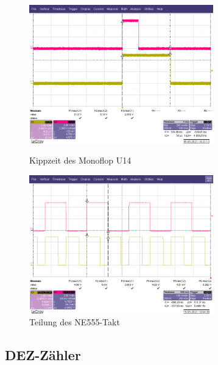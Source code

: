 \begin{figure}[htb]
    \centering
    \begin{minipage}[t]{0.45\linewidth}
        \centering
        \includegraphics[width=8cm]{Bilder/Kippzeit.png}
        \caption{Kippzeit des Monoflop U14}
    \end{minipage}%
       \hfill
    \begin{minipage}[t]{0.45\linewidth}
        \centering
        \includegraphics[width=8cm]{Bilder/Systemtakte.png}
        \caption{Teilung des NE555-Takt}
    \end{minipage}
\end{figure}




\newpage
\subsection{DEZ-Zähler}

